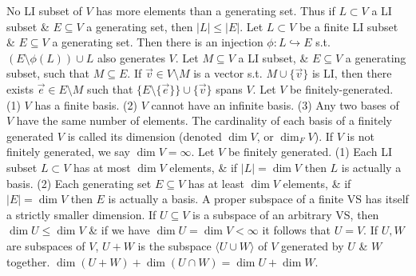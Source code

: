  No LI subset of $V$ has more elements than a generating set. Thus if $L \subset V$ a LI subset \& $E \subseteq V$ a generating set, then $|L| \le |E|$.
 Let $L \subset V$ be a finite LI subset \& $E \subseteq V$ a generating set. Then there is an injection $\phi : L \hookrightarrow E$ s.t. $(E \setminus \phi(L)) \cup L$ also generates $V$.
 Let $M \subseteq V$ a LI subset, \& $E \subseteq V$ a generating subset, such that $M \subseteq E$. If $\vec{v} \in V \setminus M$ is a vector s.t. $M \cup \{\vec{v}\}$ is LI, then there exists $\vec{e} \in E \setminus M$ such that $\{E \setminus \{\vec{e}\}\} \cup \{\vec{v}\}$ spans $V$.
 Let $V$ be finitely-generated.
(1) $V$ has a finite basis.
(2) $V$ cannot have an infinite basis.
(3) Any two bases of $V$ have the same number of elements.
 The cardinality of each basis of a finitely generated $V$ is called its dimension (denoted $\dim V$, or $\dim_{F}V$). If $V$ is not finitely generated, we say $\dim V = \infty$.
 Let $V$ be finitely generated.
(1) Each LI subset $L \subset V$ has at most $\dim V$ elements, \& if $|L| = \dim V$ then $L$ is actually a basis.
(2) Each generating set $E \subseteq V$ has at least $\dim V$ elements, \& if $|E| = \dim V$ then $E$ is actually a basis.
 A proper subspace of a finite VS has itself a strictly smaller dimension.
 If $U \subseteq V$ is a subspace of an arbitrary VS, then $\dim U \le \dim V$ \& if we have $\dim U = \dim V < \infty$ it follows that $U = V$.
 If $U,W$ are subspaces of $V$, $U + W$ is the subspace $\langle U \cup W \rangle$ of $V$ generated by $U$ \& $W$ together.
 $\dim(U + W) + \dim(U \cap W) = \dim U + \dim W$.

